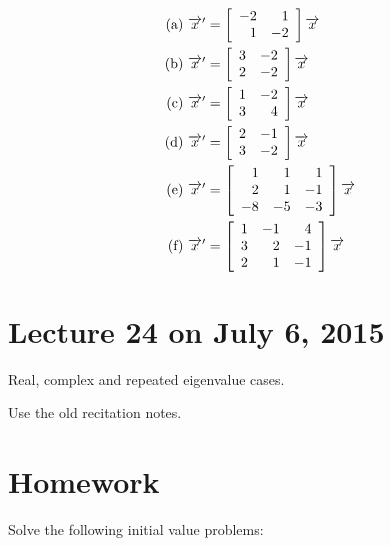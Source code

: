 \documentclass[11pt]{article}
\begin{document}
$$\begin{aligned}
\text{(a)  } & \overrightarrow{x}' = 
\left[\begin{array}{rr}
-2 & 1 \\
 1 & -2 \end{array}\right]\overrightarrow{x}\\
\text{(b)  } & \overrightarrow{x}' = 
\left[\begin{array}{rr}
 3 & -2 \\
 2 & -2 \end{array}\right]\overrightarrow{x}\\
\text{(c)  } & \overrightarrow{x}' = 
\left[\begin{array}{rr}
 1 & -2 \\
 3 & 4 \end{array}\right]\overrightarrow{x}\\
\text{(d)  } & \overrightarrow{x}' = 
\left[\begin{array}{rr}
 2 & -1 \\
 3 & -2 \end{array}\right]\overrightarrow{x}\\
\text{(e)  } & \overrightarrow{x}' = 
\left[\begin{array}{rrr}
 1 & 1 & 1\\
 2 & 1 & -1\\
 -8 & -5 & -3\end{array}\right]\overrightarrow{x}\\
\text{(f)  } & \overrightarrow{x}' = 
\left[\begin{array}{rrr}
 1 & -1 & 4\\
 3 & 2 & -1\\
 2 & 1 & -1\end{array}\right]\overrightarrow{x}\\
\end{aligned}$$

\newpage

\section{Lecture 24 on July 6, 2015}

Real, complex and repeated eigenvalue cases. 

Use the old recitation notes. 

\newpage

\section*{Homework}

Solve the following initial value problems:
\end{document}
